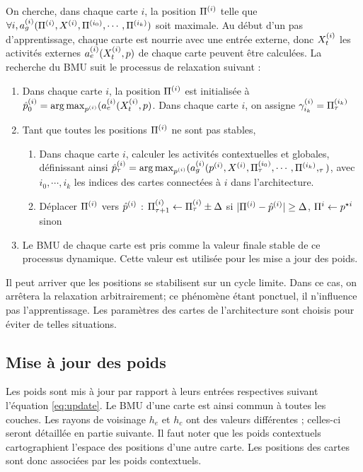 On cherche, dans chaque carte $i$, la position $\Pi^{({i})}$ telle que $\forall i, a_g^{({i})}(\Pi^{({i})},X^{({i})},\Pi^{({i_0})},\cdots,\Pi^{({i_k})})$ soit maximale.
Au début d'un pas d'apprentissage, chaque carte est nourrie avec une entrée externe, donc $X^{({i})}_t$ les activités externes $a_e^{({i})}(X^{({i})}_t,p)$ de chaque carte peuvent être calculées.
La recherche du BMU suit le processus de relaxation suivant :
\begin{enumerate}
\item Dans chaque carte $i$, la position $\Pi^{({i})}$ est initialisée à $\hat{p}^{({i})}_0 = \operatorname*{arg\,max}_{p^{({i})}}(a_e^{({i})}(X^{({i})}_t,p)$. Dans chaque carte $i$, on assigne $\gamma_{i_k}^{({i})} = \Pi^{({i_k})}_\tau$
\item Tant que toutes les positions $\Pi^{({i})}$ ne sont pas stables, 
	\begin{enumerate}
	\item Dans chaque carte $i$, calculer les activités contextuelles et globales, définissant ainsi $\hat{p}^{({i})}_\tau = \operatorname*{arg\,max}_{p^{({i})}}(a_g^{({i})}(p^{({i})},X^{({i})}, \Pi^{({i_0})}_\tau,\cdots,\Pi^{({i_k})},_\tau)$, avec $i_0, \cdots, i_k$ les indices des cartes connectées à $i$ dans l'architecture.
	\item Déplacer $\Pi^{({i})}$ vers $\hat{p}^{({i})}$ : $\Pi^{({i})}_{\tau +1} \leftarrow \Pi^{({i})}_\tau \pm \Delta$ si $\lvert \Pi^{({i})}- \hat{p}^{({i})}\rvert \geq \Delta$, $\Pi^i \leftarrow p^{\star i}$ sinon
	\end{enumerate}
\item Le BMU de chaque carte est pris comme la valeur finale stable de ce processus dynamique. Cette valeur est utilisée pour les mise a jour des poids.
\end{enumerate}

Il peut arriver que les positions se stabilisent sur un cycle limite. Dans ce cas, on arrêtera la relaxation arbitrairement; ce phénomène étant ponctuel, il n'influence pas l'apprentissage. Les paramètres des cartes de l'architecture sont choisis pour éviter de telles situations.


\subsection{Mise à jour des poids}

Les poids sont mis à jour par rapport à leurs entrées respectives suivant l'équation \ref{eq:update}. Le BMU d'une carte est ainsi commun à toutes les couches. Les rayons de voisinage $h_e$ et $h_c$ ont des valeurs différentes ; celles-ci seront détaillée en partie suivante. 
Il faut noter que les poids contextuels cartographient l'espace des positions d'une autre carte. Les positions des cartes sont donc associées par les poids contextuels.

